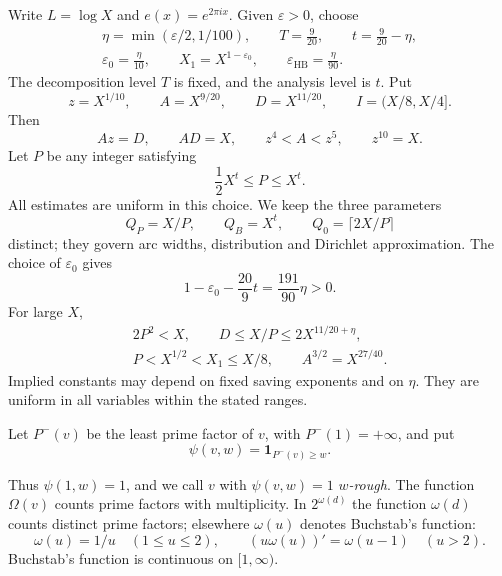 \documentclass{amsart}
\newcounter{fact}
\numberwithin{equation}{section}
\numberwithin{table}{section}
\newcommand{\ind}{\mathbf 1}
\begin{document}
Write $L=\log X$ and $e(x)=e^{2\pi ix}$.
Given $\varepsilon>0$, choose
\begin{equation}\label{eq:parameters}
\begin{gathered}
\eta=\min(\varepsilon/2,1/100),\qquad
T=\frac9{20},\qquad t=\frac9{20}-\eta,\\
\varepsilon_0=\frac\eta{10},\qquad
X_1=X^{1-\varepsilon_0},\qquad
\varepsilon_{\mathrm{HB}}=\frac\eta{90}.
\end{gathered}
\end{equation}
The decomposition level $T$ is fixed, and the analysis level is $t$.
Put
\begin{equation}\label{eq:scales}
z=X^{1/10},\qquad A=X^{9/20},\qquad D=X^{11/20},
\qquad I=(X/8,X/4].
\end{equation}
Then
\begin{equation}\label{eq:scale-identities}
Az=D,\qquad AD=X,\qquad z^4<A<z^5,\qquad z^{10}=X.
\end{equation}
Let $P$ be any integer satisfying
\begin{equation}\label{eq:P-window}
\frac12X^t\le P\le X^t.
\end{equation}
All estimates are uniform in this choice. We keep the three parameters
\begin{equation}\label{eq:Q-parameters}
Q_P=X/P,\qquad Q_B=X^t,\qquad Q_0=\lceil2X/P\rceil
\end{equation}
distinct; they govern arc widths, distribution and Dirichlet approximation.
The choice of $\varepsilon_0$ gives
\begin{equation}\label{eq:density-margin}
1-\varepsilon_0-\frac{20}{9}t=\frac{191}{90}\eta>0.
\end{equation}
For large $X$,
\begin{equation}\label{eq:elementary-ranges}
\begin{gathered}
2P^2<X,\qquad D\le X/P\le2X^{11/20+\eta},\\
P<X^{1/2}<X_1\le X/8,\qquad A^{3/2}=X^{27/40}.
\end{gathered}
\end{equation}
Implied constants may depend on fixed saving exponents and on $\eta$.
They are uniform in all variables within the stated ranges.

Let $P^-(v)$ be the least prime factor of $v$, with $P^-(1)=+\infty$, and put
\[
\psi(v,w)=\ind_{P^-(v)\ge w}.
\]

Thus $\psi(1,w)=1$, and we call $v$ with $\psi(v,w)=1$ \emph{$w$-rough}.
The function $\Omega(v)$ counts prime factors with multiplicity.
In $2^{\omega(d)}$ the function $\omega(d)$ counts distinct prime factors;
elsewhere $\omega(u)$ denotes Buchstab's function:
\begin{equation}\label{eq:buchstab-definition}
\omega(u)=1/u\quad(1\le u\le2),\qquad
(u\omega(u))'=\omega(u-1)\quad(u>2).
\end{equation}
Buchstab's function is continuous on $[1,\infty)$.
\end{document}
